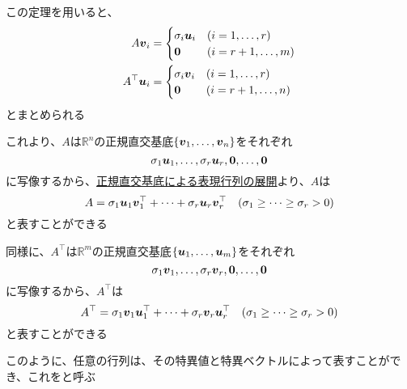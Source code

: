 \documentclass[../../../topic_linear-algebra]{subfiles}
\begin{document}
\br

この定理を用いると、
\begin{align*}
  A\vb*{v}_i       & = \begin{cases}
                         \sigma_i \vb*{u}_i & (i = 1,\ldots,r)   \\
                         \vb*{0}            & (i = r+1,\ldots,m)
                       \end{cases}  \\
  A^\top \vb*{u}_i & = \begin{cases}
                         \sigma_i \vb*{v}_i & (i = 1,\ldots, r)   \\
                         \vb*{0}            & (i = r+1,\ldots, n)
                       \end{cases}
\end{align*}
とまとめられる

\br

これより、$A$は$\mathbb{R}^n$の正規直交基底$\{ \vb*{v}_1, \ldots, \vb*{v}_n \}$をそれぞれ
\begin{equation*}
  \sigma_1\vb*{u}_1,\ldots,\sigma_r\vb*{u}_r,\vb*{0},\ldots,\vb*{0}
\end{equation*}
に写像するから、\hyperref[thm:orthobasis-formula-for-rep-matrix]{正規直交基底による表現行列の展開}より、$A$は
\begin{equation*}
  A = \sigma_1\vb*{u}_1\vb*{v}_1^\top + \cdots + \sigma_r \vb*{u}_r \vb*{v}_r^\top \quad (\sigma_1 \geq \cdots \geq \sigma_r > 0)
\end{equation*}
と表すことができる

\br

同様に、$A^\top$は$\mathbb{R}^m$の正規直交基底$\{ \vb*{u}_1, \ldots, \vb*{u}_m\}$をそれぞれ
\begin{equation*}
  \sigma_1\vb*{v}_1, \ldots, \sigma_r\vb*{v}_r,\vb*{0},\ldots,\vb*{0}
\end{equation*}
に写像するから、$A^\top$は
\begin{equation*}
  A^\top = \sigma_1\vb*{v}_1\vb*{u}_1^\top + \cdots + \sigma_r \vb*{v}_r \vb*{u}_r^\top \quad (\sigma_1 \geq \cdots \geq \sigma_r > 0)
\end{equation*}
と表すことができる

\br

このように、任意の行列は、その特異値と特異ベクトルによって表すことができ、これをと呼ぶ
\end{document}
